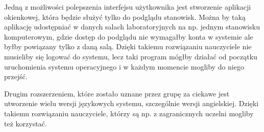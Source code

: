 Jedną z możliwości polepszenia interfejsu użytkownika jest stworzenie aplikacji okienkowej, która będzie służyć tylko do podglądu stanowisk. Można by taką aplikację udostępniać w danych salach laboratoryjnych na np. jednym stanowisku komputerowym, gdzie dostęp do podglądu nie wymagałby konta w systemie ale byłby powiązany tylko z daną salą. Dzięki takiemu rozwiązaniu nauczyciele nie musieliby się logować do systemu, lecz taki program mógłby działać od początku uruchomienia systemu operacyjnego i w każdym momencie mogliby do niego przejść.

Drugim rozszerzeniem, które zostało uznane przez grupę za ciekawe jest utworzenie wielu wersji językowych systemu, szczególnie wersji angielskiej. Dzięki takiemu rozwiązaniu nauczyciele, którzy są np. z zagranicznych uczelni mogliby też korzystać.